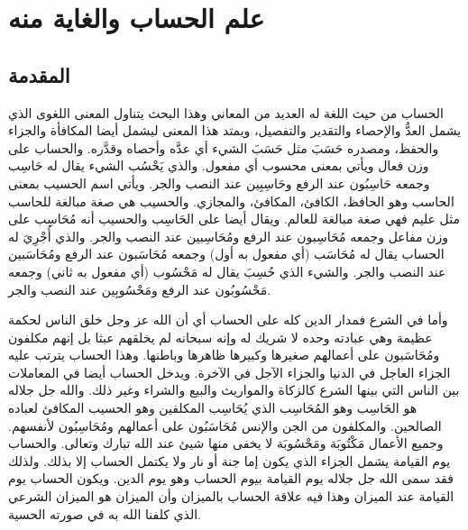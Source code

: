 \chapter{علم الحساب والغاية منه}

\section{المقدمة}

الحساب من حيث اللغة له العديد من المعاني وهذا البحث يتناول المعنى اللغوى الذي يشمل العدُّ والإحصاء والتقدير والتفصيل، ويمتد هذا المعنى ليشمل أيضا المكافأة والجزاء والحفظ، ومصدره حَسَبَ مثل حَسَبَ الشيء أي عدَّه وأحصاه وقدَّره. والحساب على وزن فعال ويأتي بمعنى محسوب أي مفعول. والذي يَحْسُب الشيء يقال له حَاسِب  وجمعه حَاسِبُون عند الرفع  وحَاسِبِين عند النصب والجر. ويأتي اسم الحسيب بمعنى الحاسب وهو الحافظ، الكافئ، المكافئ، والمجازي. والحسيب هي صغة مبالغة للحاسب مثل عليم فهي صغة مبالغة للعالم. ويقال أيضا على الحَاسِب والحسيب أنه مُحَاسِب على وزن مفاعل وجمعه مُحَاسِبون عند الرفع ومُحَاسِبين عند النصب والجر. والذي أُجْرِيَ له الحساب يقال له مُحَاسَب (أي مفعول به أول) وجمعه مُحَاسَبون عند الرفع ومُحَاسَبين عند النصب والجر. والشيء الذي حُسِبَ يقال له مَحْسُوب (أي مفعول به ثاني) وجمعه مَحْسُوبُون عند الرفع ومَحْسُوبِين عند النصب والجر. 

وأما في الشرع فمدار الدين كله على الحساب أي أن الله عز وجل خلق الناس لحكمة عظيمة وهي عبادته وحده لا شريك له وإنه سبحانه لم يخلقهم عبثا بل إنهم مكلفون ومُحَاسَبون على أعمالهم صغيرها وكبيرها ظاهرها وباطنها. وهذا الحساب يترتب عليه الجزاء العاجل في الدنيا والجزاء الآجل في الآخرة. ويدخل الحساب أيضا في المعاملات بين الناس التي بينها الشرع كالزكاة والمواريث والبيع والشراء وغير ذلك. والله جل جلاله هو الحَاسِب وهو المُحَاسِب الذي يُحَاسِب المكلفين وهو الحسيب المكافئ لعباده الصالحين. والمكلفون من الجن والإنس مُحَاسَبُون على أعمالهم ومُحَاسِبُون لأنفسهم. وجميع الأعمال مَكْتُوبَة ومَحْسُوبَة لا يخفى منها شيئ عند الله تبارك وتعالى. والحساب يوم القيامة يشمل الجزاء الذي يكون إما جنة أو نار ولا يكتمل الحساب إلا بذلك. ولذلك فقد سمى الله جل جلاله يوم القيامة بيوم الحساب وهو يوم الدين. ويكون الحساب يوم القيامة عند الميزان وهذا فيه علاقة الحساب بالميزان وأن الميزان هو الميزان الشرعي الذي كلفنا الله به في صورته الحسية. 

